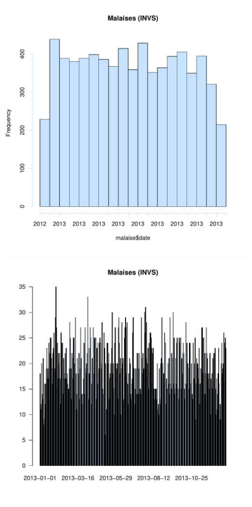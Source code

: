 \documentclass[12pt,english,french,twoside]{book}\usepackage[]{graphicx}\usepackage[]{color}
\makeatletter
\def\maxwidth{ %
  \ifdim\Gin@nat@width>\linewidth
    \linewidth
  \else
    \Gin@nat@width
  \fi
}
\newenvironment{knitrout}{}{} %
\makeatother
\begin{document}
\begin{knitrout}
\color{fgcolor}
\includegraphics[width=\maxwidth]{figure/malaises_invs1} 

\includegraphics[width=\maxwidth]{figure/malaises_invs2} 

\end{knitrout}
\end{document}
